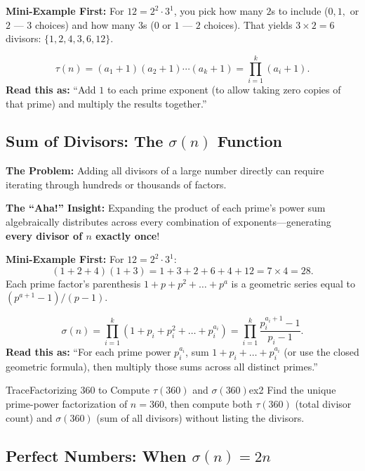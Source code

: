 \documentclass[11pt,a4paper]{article}
\theoremstyle{definition}
\newcommand{\painbeat}{\textbf{\color{accentamber}The Problem:} }
\newcommand{\ahabeat}{\textbf{\color{accentteal}The ``Aha!'' Insight:} }
\newcommand{\examplebeat}{\textbf{\color{primaryblue}Mini-Example First:} }
\begin{document}
\examplebeat For $12 = 2^2 \cdot 3^1$, you pick how many $2$s to include ($0, 1,$ or $2$ --- $3$ choices) and how many $3$s ($0$ or $1$ --- $2$ choices). That yields $3 \times 2 = 6$ divisors: $\{1, 2, 4, 3, 6, 12\}$.

\begin{formulabox}
\[
    \tau(n) = (a_1 + 1)(a_2 + 1) \cdots (a_k + 1) = \prod_{i=1}^k (a_i + 1).
\]
\textbf{Read this as:} ``Add $1$ to each prime exponent (to allow taking zero copies of that prime) and multiply the results together.''
\end{formulabox}

\subsection{Sum of Divisors: The \texorpdfstring{$\sigma(n)$}{sigma(n)} Function}

\painbeat Adding all divisors of a large number directly can require iterating through hundreds or thousands of factors.

\ahabeat Expanding the product of each prime's power sum algebraically distributes across every combination of exponents---generating \textbf{every divisor of $n$ exactly once}!

\examplebeat For $12 = 2^2 \cdot 3^1$:
\[
    (1 + 2 + 4)(1 + 3) = 1 + 3 + 2 + 6 + 4 + 12 = 7 \times 4 = 28.
\]
Each prime factor's parenthesis $1 + p + p^2 + \dots + p^a$ is a geometric series equal to $(p^{a+1} - 1)/(p - 1)$.

\begin{formulabox}
\[
    \sigma(n) = \prod_{i=1}^k \left(1 + p_i + p_i^2 + \dots + p_i^{a_i}\right) = \prod_{i=1}^k \frac{p_i^{a_i + 1} - 1}{p_i - 1}.
\]
\textbf{Read this as:} ``For each prime power $p_i^{a_i}$, sum $1 + p_i + \dots + p_i^{a_i}$ (or use the closed geometric formula), then multiply those sums across all distinct primes.''
\end{formulabox}

\begin{tryitbox}{Trace}{Factorizing $360$ to Compute $\tau(360)$ and $\sigma(360)$}{ex2}
Find the unique prime-power factorization of $n = 360$, then compute both $\tau(360)$ (total divisor count) and $\sigma(360)$ (sum of all divisors) without listing the divisors.
\end{tryitbox}

\subsection{Perfect Numbers: When \texorpdfstring{$\sigma(n) = 2n$}{sigma(n) = 2n}}
\end{document}
